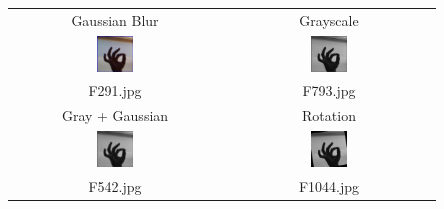 \documentclass[10pt,twocolumn,letterpaper]{article}
\begin{document}
\begin{center}
    \vspace{3mm}
    \begin{tabular}{|c|c|}
        \hline
        Gaussian Blur & Grayscale \\
        \includegraphics[width=0.18\textwidth]{../asl_alphabet_modified/F/F291.jpg}
        & \includegraphics[width=0.18\textwidth]{../asl_alphabet_modified/F/F793.jpg} \\
        F291.jpg & F793.jpg \\
        \hline
        Gray + Gaussian & Rotation \\
        \includegraphics[width=0.18\textwidth]{../asl_alphabet_modified/F/F542.jpg}
        & \includegraphics[width=0.18\textwidth]{../asl_alphabet_modified/F/F1044.jpg} \\
        F542.jpg & F1044.jpg \\
        \hline
    \end{tabular}
\end{center}




\end{document}
